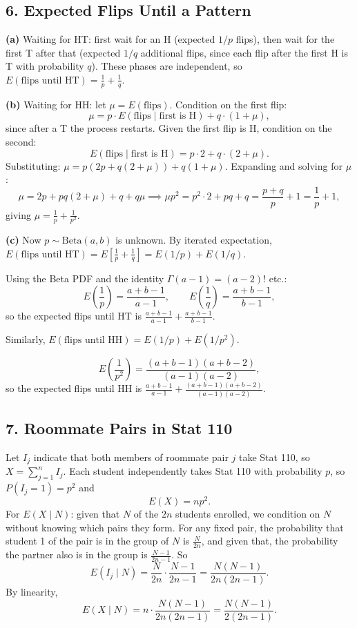 \documentclass{article}
\begin{document}
\subsection*{6. Expected Flips Until a Pattern}

\textbf{(a)} Waiting for HT: first wait for an H (expected $1/p$ flips), then wait for the first T after that (expected $1/q$ additional flips, since each flip after the first H is T with probability $q$). These phases are independent, so $E(\text{flips until HT})=\frac{1}{p}+\frac{1}{q}$.

\textbf{(b)} Waiting for HH: let $\mu=E(\text{flips})$. Condition on the first flip:
$$
\mu = p\cdot E(\text{flips}\mid\text{first is H}) + q\cdot(1+\mu),
$$
since after a T the process restarts. Given the first flip is H, condition on the second:
$$
E(\text{flips}\mid\text{first is H}) = p\cdot 2 + q\cdot(2+\mu).
$$
Substituting: $\mu = p(2p+q(2+\mu))+q(1+\mu)$. Expanding and solving for $\mu$:
$$
\mu = 2p+pq(2+\mu)+q+q\mu \implies \mu p^2 = p^2\cdot 2+pq+q = \frac{p+q}{p}+1 = \frac{1}{p}+1,
$$
giving $\mu = \frac{1}{p}+\frac{1}{p^2}$.

\textbf{(c)} Now $p\sim\text{Beta}(a,b)$ is unknown. By iterated expectation, $E(\text{flips until HT})=E\!\left[\frac{1}{p}+\frac{1}{q}\right]=E(1/p)+E(1/q)$.

Using the Beta PDF and the identity $\Gamma(a-1)=(a-2)!$ etc.:
$$
E\!\left(\frac{1}{p}\right) = \frac{a+b-1}{a-1}, \qquad E\!\left(\frac{1}{q}\right) = \frac{a+b-1}{b-1},
$$
so the expected flips until HT is $\frac{a+b-1}{a-1}+\frac{a+b-1}{b-1}$.

Similarly, $E(\text{flips until HH})=E(1/p)+E(1/p^2)$.

$$
E\!\left(\frac{1}{p^2}\right) = \frac{(a+b-1)(a+b-2)}{(a-1)(a-2)},
$$
so the expected flips until HH is $\frac{a+b-1}{a-1}+\frac{(a+b-1)(a+b-2)}{(a-1)(a-2)}$.

\subsection*{7. Roommate Pairs in Stat 110}

Let $I_j$ indicate that both members of roommate pair $j$ take Stat 110, so $X=\sum_{j=1}^n I_j$. Each student independently takes Stat 110 with probability $p$, so $P(I_j=1)=p^2$ and
$$
E(X) = np^2.
$$
For $E(X\mid N)$: given that $N$ of the $2n$ students enrolled, we condition on $N$ without knowing which pairs they form. For any fixed pair, the probability that student 1 of the pair is in the group of $N$ is $\frac{N}{2n}$, and given that, the probability the partner also is in the group is $\frac{N-1}{2n-1}$. So
$$
E(I_j\mid N) = \frac{N}{2n}\cdot\frac{N-1}{2n-1} = \frac{N(N-1)}{2n(2n-1)}.
$$
By linearity,
$$
E(X\mid N) = n\cdot\frac{N(N-1)}{2n(2n-1)} = \frac{N(N-1)}{2(2n-1)}.
$$
\end{document}
